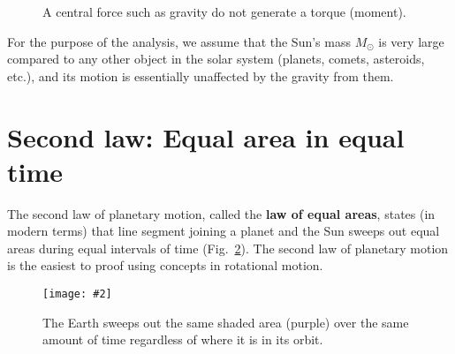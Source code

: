 \documentclass{../../../oss-handout}
\newcommand{\mb}[1]{\ensuremath\mathbf{#1}}
\newcommand{\pic}[2]{\texttt{[image: \#2]}}
\begin{document}
\begin{figure}[!ht]
  \centering
  \caption{A central force such as gravity do not generate a torque (moment).}
  \label{central-force}
\end{figure}
For the purpose of the analysis, we assume that the Sun's mass $M_\odot$
is very large compared to any other object in the solar system (planets,
comets, asteroids, etc.), and its motion is essentially unaffected by the
gravity from them.

\section{Second law: Equal area in equal time}

The second law of planetary motion, called the \textbf{law of equal areas},
states (in modern terms) that line segment joining a planet and the Sun sweeps
out equal areas during equal intervals of time (Fig.~\ref{kep2}). The second
law of planetary motion is the easiest to proof using concepts in rotational
motion.
\begin{figure}[!ht]
  \centering
    \pic{.4}{../201532-132212364-3243-planet}
    \caption{The Earth sweeps out the same shaded area (purple) over the
      same amount of time regardless of where it is in its orbit.}
    \label{kep2}
\end{figure}
\end{document}
